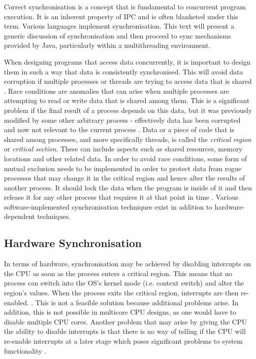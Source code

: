 \documentclass[12pt,a4paper,oneside]{article}
\begin{document}
\begin{spacing}{1.4}
Correct synchronisation is a concept that is fundamental to concurrent program execution. It is an inherent property of IPC and is often blanketed under this term. Various languages implement synchronisation. This text will present a generic discussion of synchronisation and then proceed to sync mechanisms provided by Java, particularly within a multithreading environment.

When designing programs that access data concurrently, it is important to design them in such a way that data is consistently synchronised. This will avoid data corruption if multiple processes or threads are trying to access data that is shared \citep{garg2005concurrent}. Race conditions are anomalies that can arise when multiple processes are attempting to read or write data that is shared among them. This is a significant problem if the final result of a process depends on this data, but it was previously modified by some other arbitrary process - effectively data has been corrupted and now not relevant to the current process \citep{modernOS}. Data or a piece of code that is shared among processes, and more specifically threads, is called the \textit{critical region} or \textit{critical section}. These can include aspects such as shared resources, memory locations and other related data. In order to avoid race conditions, some form of mutual exclusion needs to be implemented in order to protect data from rogue processes that may change it in the critical region and hence alter the results of another process. It should lock the data when the program is inside of it and then release it for any other process that requires it at that point in time \citep{multithreadingwin32}. Various software-implemented synchronisation techniques exist in addition to hardware-dependent techniques. 

\subsection{Hardware Synchronisation}
In terms of hardware, synchronisation may be achieved by disabling interrupts on the CPU as soon as the process enters a critical region. This means that no process can switch into the OS's kernel mode (i.e. context switch) and alter the region's values. When the process exits the critical region, interrupts are then re-enabled. \citep{garg2005concurrent}. This is not a feasible solution because additional problems arise. In addition, this is not possible in multicore CPU designs, as one would have to disable multiple CPU cores. Another problem that may arise by giving the CPU the ability to disable interrupts is that there is no way of telling if the CPU will re-enable interrupts at a later stage which poses significant problems to system functionality \citep{modernOS}.


\end{spacing}
\end{document}
